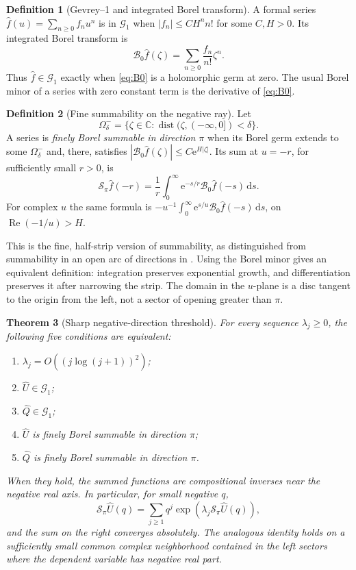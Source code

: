 \documentclass[11pt,a4paper]{article}
\numberwithin{equation}{section}
\newtheorem{theorem}{Theorem}[section]
\theoremstyle{definition}
\newtheorem{definition}[theorem]{Definition}
\theoremstyle{remark}
\newcommand{\C}{\mathbb C}
\newcommand{\U}{\widehat U}
\newcommand{\Q}{\widehat Q}
\newcommand{\B}{\mathcal B_0}
\newcommand{\G}{\mathcal G_1}
\newcommand{\ee}{\mathrm e}
\newcommand{\dd}{\mathrm d}
\newcommand{\Ree}{\operatorname{Re}}
\newcommand{\dist}{\operatorname{dist}}
\begin{document}
\begin{definition}[Gevrey--1 and integrated Borel transform]
A formal series $\widehat f(u)=\sum_{n\ge0}f_nu^n$ is in $\G$ when
$|f_n|\le C H^n n!$ for some $C,H>0$.  Its integrated Borel transform is
\begin{equation}
 \B\widehat f(\zeta)=\sum_{n\ge0}\frac{f_n}{n!}\zeta^n.
 \label{eq:B0}
\end{equation}
Thus $\widehat f\in\G$ exactly when \eqref{eq:B0} is a holomorphic germ at
zero.  The usual Borel minor of a series with zero constant term is the
derivative of \eqref{eq:B0}.
\end{definition}

\begin{definition}[Fine summability on the negative ray]
\label{def:fine}
Let
\[
 \Omega^-_\delta=\{\zeta\in\C:\dist(\zeta,(-\infty,0])<\delta\}.
\]
A series is \emph{finely Borel summable in direction $\pi$} when its Borel
germ extends to some $\Omega^-_\delta$ and, there, satisfies
$|\B\widehat f(\zeta)|\le C\ee^{H|\zeta|}$.
Its sum at $u=-r$, for sufficiently small $r>0$, is
\begin{equation}
 \mathcal S_\pi\widehat f(-r)
  =\frac1r\int_0^\infty\ee^{-s/r}\B\widehat f(-s)\,\dd s.
 \label{eq:laplace}
\end{equation}
For complex $u$ the same formula is
$-u^{-1}\int_0^\infty \ee^{s/u}\B\widehat f(-s)\,\dd s$, on
$\Ree(-1/u)>H$.
\end{definition}

This is the fine, half-strip version of summability, as distinguished from
summability in an open arc of directions in \cite[Sections 7 and 9]{sauzin}.
Using the Borel minor gives an equivalent definition: integration preserves
exponential growth, and differentiation preserves it after narrowing the
strip.  The domain in the $u$-plane is a disc tangent to the origin from
the left, not a sector of opening greater than $\pi$.

\begin{theorem}[Sharp negative-direction threshold]
\label{thm:threshold}
For every sequence $\lambda_j\ge0$, the following five conditions are
equivalent:
\begin{enumerate}[label=(\roman*)]
\item $\lambda_j=O((j\log(j+1))^2)$;
\item $\U\in\G$;
\item $\Q\in\G$;
\item $\U$ is finely Borel summable in direction $\pi$;
\item $\Q$ is finely Borel summable in direction $\pi$.
\end{enumerate}
When they hold, the summed functions are compositional inverses near the
negative real axis.  In particular, for small negative $q$,
\begin{equation}
 \mathcal S_\pi\U(q)
 =\sum_{j\ge1}q^j\exp\!\left(\lambda_j\mathcal S_\pi\U(q)\right),
 \label{eq:summed-feedback}
\end{equation}
and the sum on the right converges absolutely.  The analogous identity
holds on a sufficiently small common complex neighborhood contained in
the left sectors where the dependent variable has negative real part.
\end{theorem}
\end{document}
